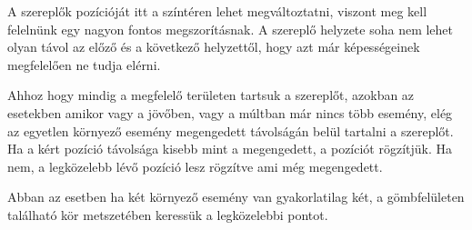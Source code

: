 A szereplők pozícióját itt a színtéren lehet megváltoztatni, viszont meg kell felelnünk egy nagyon fontos megszorításnak. A szereplő helyzete soha nem lehet olyan távol az előző és a következő helyzettől, hogy azt már képességeinek megfelelően ne tudja elérni.

Ahhoz hogy mindig a megfelelő területen tartsuk a szereplőt, azokban az esetekben amikor vagy a jövőben, vagy a múltban már nincs több esemény, elég az egyetlen környező esemény megengedett távolságán belül tartalni a szereplőt. Ha a kért pozíció távolsága kisebb mint a megengedett, a pozíciót rögzítjük. Ha nem, a legközelebb lévő pozíció lesz rögzítve ami még megengedett.

Abban az esetben ha két környező esemény van gyakorlatilag két, a gömbfelületen található kör metszetében keressük a legközelebbi pontot.

